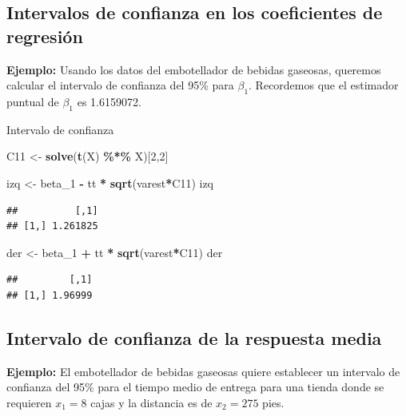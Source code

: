 \documentclass[
]{book}
\newenvironment{Shaded}{\begin{snugshade}}{\end{snugshade}}
\newcommand{\DecValTok}[1]{\textcolor[rgb]{0.00,0.00,0.81}{#1}}
\newcommand{\FunctionTok}[1]{\textcolor[rgb]{0.13,0.29,0.53}{\textbf{#1}}}
\newcommand{\NormalTok}[1]{#1}
\newcommand{\OtherTok}[1]{\textcolor[rgb]{0.56,0.35,0.01}{#1}}
\newcommand{\SpecialCharTok}[1]{\textcolor[rgb]{0.81,0.36,0.00}{\textbf{#1}}}
\begin{document}
\subsection{Intervalos de confianza en los coeficientes de regresión}\label{intervalos-de-confianza-en-los-coeficientes-de-regresiuxf3n}

\textbf{Ejemplo:} Usando los datos del embotellador de bebidas gaseosas, queremos calcular el intervalo de confianza del 95\% para \(\beta_1\). Recordemos que el estimador puntual de \(\beta_1\) es 1.6159072.

Intervalo de confianza

\begin{Shaded}
\begin{Highlighting}[]
\NormalTok{C11 }\OtherTok{\textless{}{-}} \FunctionTok{solve}\NormalTok{(}\FunctionTok{t}\NormalTok{(X) }\SpecialCharTok{\%*\%}\NormalTok{ X)[}\DecValTok{2}\NormalTok{,}\DecValTok{2}\NormalTok{]}

\NormalTok{izq }\OtherTok{\textless{}{-}}\NormalTok{ beta\_1 }\SpecialCharTok{{-}}\NormalTok{ tt }\SpecialCharTok{*} \FunctionTok{sqrt}\NormalTok{(varest}\SpecialCharTok{*}\NormalTok{C11)}
\NormalTok{izq}
\end{Highlighting}
\end{Shaded}

\begin{verbatim}
##          [,1]
## [1,] 1.261825
\end{verbatim}

\begin{Shaded}
\begin{Highlighting}[]
\NormalTok{der }\OtherTok{\textless{}{-}}\NormalTok{ beta\_1 }\SpecialCharTok{+}\NormalTok{ tt }\SpecialCharTok{*} \FunctionTok{sqrt}\NormalTok{(varest}\SpecialCharTok{*}\NormalTok{C11)}
\NormalTok{der}
\end{Highlighting}
\end{Shaded}

\begin{verbatim}
##         [,1]
## [1,] 1.96999
\end{verbatim}

\subsection{Intervalo de confianza de la respuesta media}\label{intervalo-de-confianza-de-la-respuesta-media}

\textbf{Ejemplo:} El embotellador de bebidas gaseosas quiere establecer un intervalo de confianza del 95\% para el tiempo medio de entrega para una tienda donde se requieren \(x_1=8\) cajas y la distancia es de \(x_2=275\) pies.
\end{document}
